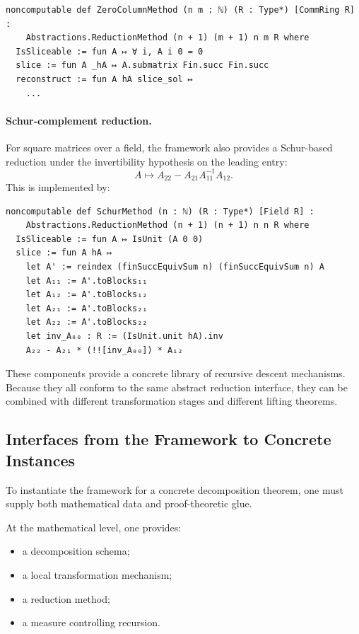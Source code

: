 \documentclass[pdflatex,sn-mathphys-num]{sn-jnl}%
\theoremstyle{thmstyleone}%
\theoremstyle{thmstyletwo}%
\theoremstyle{thmstylethree}%
\begin{document}
\begin{lstlisting}
noncomputable def ZeroColumnMethod (n m : ℕ) (R : Type*) [CommRing R] :
    Abstractions.ReductionMethod (n + 1) (m + 1) n m R where
  IsSliceable := fun A ↦ ∀ i, A i 0 = 0
  slice := fun A _hA ↦ A.submatrix Fin.succ Fin.succ
  reconstruct := fun A hA slice_sol ↦
    ...
\end{lstlisting}

\paragraph{Schur-complement reduction.}
For square matrices over a field, the framework also provides a Schur-based reduction under the invertibility hypothesis on the leading entry:
\[
A \mapsto A_{22} - A_{21}A_{11}^{-1}A_{12}.
\]
This is implemented by:

\begin{lstlisting}
noncomputable def SchurMethod (n : ℕ) (R : Type*) [Field R] :
    Abstractions.ReductionMethod (n + 1) (n + 1) n n R where
  IsSliceable := fun A ↦ IsUnit (A 0 0)
  slice := fun A hA ↦
    let A' := reindex (finSuccEquivSum n) (finSuccEquivSum n) A
    let A₁₁ := A'.toBlocks₁₁
    let A₁₂ := A'.toBlocks₁₂
    let A₂₁ := A'.toBlocks₂₁
    let A₂₂ := A'.toBlocks₂₂
    let inv_A₀₀ : R := (IsUnit.unit hA).inv
    A₂₂ - A₂₁ * (!![inv_A₀₀]) * A₁₂
\end{lstlisting}

These components provide a concrete library of recursive descent mechanisms.  Because they all conform to the same abstract reduction interface, they can be combined with different transformation stages and different lifting theorems.

\subsection{Interfaces from the Framework to Concrete Instances}

To instantiate the framework for a concrete decomposition theorem, one must supply both mathematical data and proof-theoretic glue.

At the mathematical level, one provides:

\begin{itemize}
\item a decomposition schema;
\item a local transformation mechanism;
\item a reduction method;
\item a measure controlling recursion.
\end{itemize}
\end{document}
